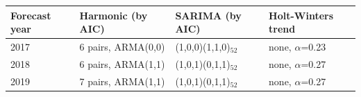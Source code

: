 \begin{tabular}{|l|l|l|l|}
\hline
\textbf{Forecast year} & \textbf{Harmonic (by AIC)} & \textbf{SARIMA (by AIC)} & \textbf{Holt-Winters trend} \\\hline
2017 & 6 pairs, ARMA(0,0) & (1,0,0)(1,1,0)$_{52}$ & none, $\alpha$=0.23 \\\hline
2018 & 6 pairs, ARMA(1,1) & (1,0,1)(0,1,1)$_{52}$ & none, $\alpha$=0.27 \\\hline
2019 & 7 pairs, ARMA(1,1) & (1,0,1)(0,1,1)$_{52}$ & none, $\alpha$=0.27 \\\hline
\end{tabular}
